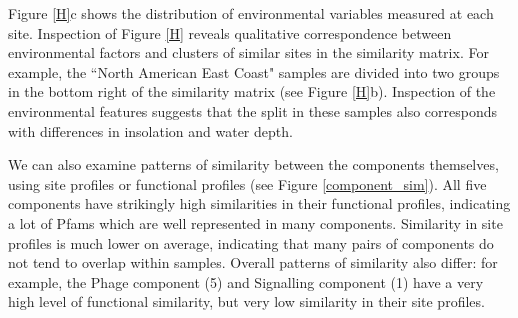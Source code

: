Figure \ref{H}c shows the distribution of environmental variables measured at each site.  Inspection of Figure \ref{H} reveals qualitative correspondence between environmental factors and clusters of similar sites in the similarity matrix. For example, the ``North American East Coast" samples are divided into two groups in the bottom right of the similarity matrix (see Figure \ref{H}b). Inspection of the environmental features suggests that the split in these samples also corresponds with differences in insolation and water depth. 


We can also examine patterns of similarity between the components themselves, using site profiles or functional profiles (see Figure \ref{component_sim}). All five components have strikingly high similarities in their functional profiles, indicating a lot of Pfams which are well represented in many components. Similarity in site profiles is much lower on average, indicating that many pairs of components do not tend to overlap within samples. Overall patterns of similarity also differ: for example, the Phage component (5) and Signalling component (1) have a very high level of functional similarity, but very low similarity in their site profiles.